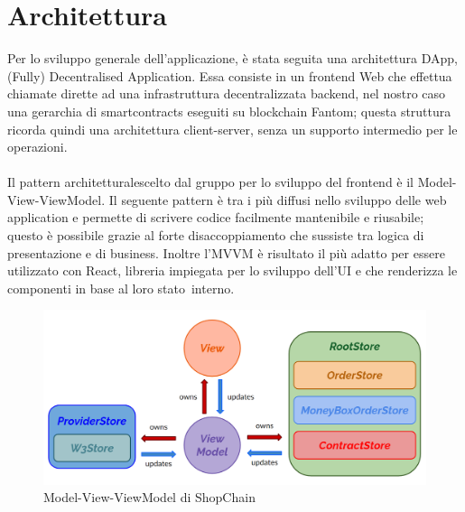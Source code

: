 \section{Architettura} \label{section:architettura}

Per lo sviluppo generale dell'applicazione, è stata seguita una architettura DApp\glo, (Fully) Decentralised Application.
Essa consiste in un frontend Web che effettua chiamate dirette ad una infrastruttura decentralizzata backend, nel 
nostro caso una gerarchia di smartcontracts eseguiti su blockchain Fantom; 
questa struttura ricorda quindi una architettura client-server, senza un supporto intermedio per le operazioni.
\\
\\
Il pattern architetturale\glo scelto dal gruppo per lo sviluppo del frontend è il Model-View-ViewModel\glo. Il
seguente pattern è tra i più diffusi nello sviluppo delle web application e permette di scrivere codice
facilmente mantenibile e riusabile; questo è possibile grazie al forte disaccoppiamento che sussiste tra
logica di presentazione e di business. Inoltre l'MVVM è risultato il più adatto per essere utilizzato con
React, libreria impiegata per lo sviluppo dell'UI e che renderizza le componenti in base al loro stato\glo\ interno.

\begin{figure}[H]
    \centering
    \includegraphics[scale=0.3]{immagini/mvvm.png}
    \caption{Model-View-ViewModel di ShopChain}
\end{figure}

